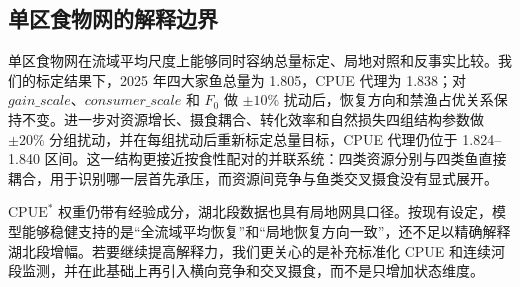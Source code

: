 \subsection{单区食物网的解释边界}
单区食物网在流域平均尺度上能够同时容纳总量标定、局地对照和反事实比较。我们的标定结果下，2025 年四大家鱼总量为 1.805，CPUE 代理为 1.838；对 $gain\_scale$、$consumer\_scale$ 和 $F_0$ 做 $\pm10\%$ 扰动后，恢复方向和禁渔占优关系保持不变。进一步对资源增长、摄食耦合、转化效率和自然损失四组结构参数做 $\pm20\%$ 分组扰动，并在每组扰动后重新标定总量目标，CPUE 代理仍位于 1.824--1.840 区间。这一结构更接近按食性配对的并联系统：四类资源分别与四类鱼直接耦合，用于识别哪一层首先承压，而资源间竞争与鱼类交叉摄食没有显式展开。

$\mathrm{CPUE}^*$ 权重仍带有经验成分，湖北段数据也具有局地网具口径。按现有设定，模型能够稳健支持的是“全流域平均恢复”和“局地恢复方向一致”，还不足以精确解释湖北段增幅。若要继续提高解释力，我们更关心的是补充标准化 CPUE 和连续河段监测，并在此基础上再引入横向竞争和交叉摄食，而不是只增加状态维度。


